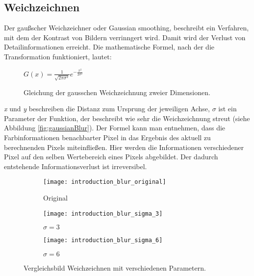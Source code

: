 \subsection{Weichzeichnen}
Der gaußscher Weichzeichner oder Gaussian smoothing, beschreibt ein Verfahren, mit dem der Kontrast von Bildern
verrinngert wird. Damit wird der Verlust von Detailinformationen erreicht. Die mathematische Formel, nach der die
Transformation funktioniert, lautet:

\parskip\baselineskip

\begin{figure}[h]
    \centering
    \(G(x) = \frac{1}{\sqrt{2 \pi \sigma^2}} e^{-\frac{x^2}{2 \sigma^2}}\)
    \caption{Gleichung der gausschen Weichzeichnung zweier Dimensionen.}
    \label{fig:func-blur}
\end{figure}


\par
\par

\textit{x} und \textit{y} beschreiben die Distanz zum Ursprung der jeweiligen Achse, \textit{\(\sigma\)} ist ein Parameter der Funktion, der
beschreibt wie sehr die Weichzeichnung streut (siehe Abbildung \space \vref*{fig:gaussianBlur}).
Der Formel kann man entnehmen, dass die
Farbinformationen benachbarter Pixel in das Ergebnis des aktuell zu berechnenden Pixels miteinfließen. Hier werden
die Informationen verschiedener Pixel auf den selben Wertebereich eines Pixels abgebildet. Der dadurch entstehende
Informationsverlust ist irreversibel.

\captionsetup[subfigure]{labelformat=empty, labelsep=none}
\begin{figure}[h]
    \centering
    \begin{subfigure}{0.3\textwidth}
        \texttt{[image: introduction\_blur\_original]}
        \caption{\small Original}
    \end{subfigure}
    \begin{subfigure}{0.3\textwidth}
        \texttt{[image: introduction\_blur\_sigma\_3]}
        \caption{\small \(\sigma = 3\)}
    \end{subfigure}
    \begin{subfigure}{0.3\textwidth}
        \texttt{[image: introduction\_blur\_sigma\_6]}
        \caption{\small \(\sigma = 6\)}
    \end{subfigure}

    \caption{Vergleichsbild Weichzeichnen mit verschiedenen Parametern.}
    \label{fig:gaussianBlur}
\end{figure}

